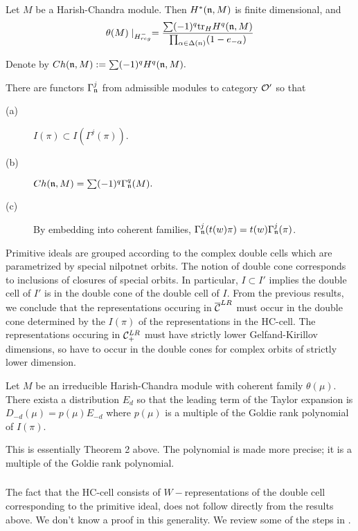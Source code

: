 \documentclass[11pt ,reqno]{amsart}
\begin{document}
\begin{theorem} Let $M$ be a Harish-Chandra
  module. Then $H^*({\mathfrak{n}},M)$ is finite dimensional, and
  $$
\theta(M)\mid_{H^-_{reg}}=\frac{\sum (-1)^q{\operatorname{tr}}_H H^q({\mathfrak{n}},M)}{\prod_{{\alpha}\in\Delta(n)}(1-e_{-{\alpha}})} 
$$
\end{theorem}
Denote by $Ch({\mathfrak{n}},M):=\sum (-1)^q H^q({\mathfrak{n}},M).$  
\begin{proposition} There are functors
  $\Gamma_{{\mathfrak{n}}}^j$ from admissible modules to category ${{\mathcal O}}'$ so that
  \begin{description}
  \item[(a)] $I(\pi)\subset I(\Gamma^j(\pi))$.
  \item[(b)] $Ch({\mathfrak{n}},M)=\sum (-1)^q\Gamma_{{\mathfrak{n}}} ^q(M).$
    \item[(c)] By embedding into coherent families,
      $\Gamma^j_{{\mathfrak{n}}}(t(w)\pi)=t(w)\Gamma^j_{{\mathfrak{n}}}(\pi)$. 
  \end{description}  
\end{proposition}
 
Primitive ideals are grouped according to  the complex double
cells which are parametrized by special nilpotnet orbits. The notion
of double cone corresponds to inclusions of closures of special
orbits. In particular, $I\subset I'$ implies the double cell of $I'$
is in the double cone of the double cell of $I.$ From the previous
results, we conclude that the representations occuring in $\overline{{\mathcal C}}^{LR}$ must occur in the double cone determined by the $I(\pi)$ of
the representations in the HC-cell. The representations occuring in
${\mathcal C}^{LR}_+$ must have strictly lower Gelfand-Kirillov dimensions, so
have to occur in the double cones for complex orbits of strictly lower
dimension.
\begin{corollary}
Let $M$ be an irreducible Harish-Chandra module with coherent family
$\theta(\mu)$. There exista a distribution $E_d$ so that the leading
term of the Taylor expansion is $D_{-d}(\mu)=p(\mu)E_{-d}$ where
$p(\mu)$ is a multiple of the Goldie rank polynomial of $I(\pi)$.
\end{corollary}
This is essentially Theorem 2 above. The polynomial is made more
precise; it is a multiple of the Goldie rank polynomial. 


\subsubsection{} The fact that the HC-cell consists of
$W-$representations  of the double cell corresponding to the primitive
ideal, does not follow directly from the results above. We don't know
a proof in this generality. We review some of the steps in \cite{McG}.   
\end{document}
